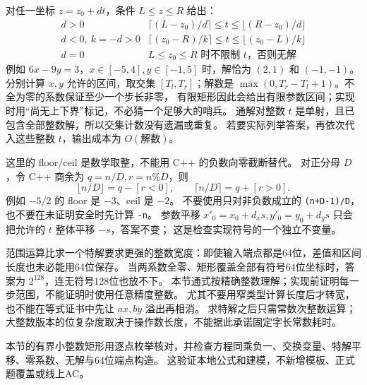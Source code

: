 对任一坐标 $z=z_0+dt$，条件 $L\le z\le R$ 给出：
\[
\begin{array}{c|c}
 d>0 & \lceil(L-z_0)/d\rceil\le t\le\lfloor(R-z_0)/d\rfloor\\[2pt]
 d<0,\ k=-d>0 & \lceil(z_0-R)/k\rceil\le t\le\lfloor(z_0-L)/k\rfloor\\[2pt]
 d=0 & L\le z_0\le R\text{ 时不限制 }t\text{，否则无解}
\end{array}
\]
例如 $6x-9y=3$，$x\in[-5,4],y\in[-1,5]$ 时，解恰为 $(2,1)$ 和 $(-1,-1)$。
分别计算 $x,y$ 允许的区间，取交集 $[T_l,T_r]$；解数是
$\max(0,T_r-T_l+1)$。不全为零的系数保证至少一个步长非零，
有限矩形因此会给出有限参数区间；实现时用“尚无上下界”标记，不必猜一个足够大的哨兵。
通解对整数 $t$ 是单射，且已包含全部整数解，所以交集计数没有遗漏或重复。
若要实际列举答案，再依次代入这些整数 $t$，输出成本为 $O(\text{解数})$。

这里的 floor/ceil 是数学取整，不能用 C++ 的负数向零截断替代。
对正分母 $D$，令 C++ 商余为 $q=n/D,r=n\%D$，则
\[
\lfloor n/D\rfloor=q-[r<0],\qquad
\lceil n/D\rceil=q+[r>0].
\]
例如 $-5/2$ 的 floor 是 $-3$、ceil 是 $-2$。
不要使用只对非负数成立的 \texttt{(n+D-1)/D}，也不要在未证明安全时先计算 \texttt{-n}。
参数平移 $x'_0=x_0+d_xs,y'_0=y_0+d_ys$ 只会把允许的 $t$ 整体平移 $-s$，答案不变；
这是检查实现符号的一个独立不变量。

范围运算比求一个特解要求更强的整数宽度：即使输入端点都是64位，差值和区间长度也未必能用64位保存。
当两系数全零、矩形覆盖全部有符号64位坐标时，答案为 $2^{128}$，连无符号128位也放不下。
本节通式按精确整数理解；实现前证明每一步范围，不能证明时使用任意精度整数。
尤其不要用窄类型计算长度后才转宽，也不能在等式证书中先让 $ax,by$ 溢出再相消。
求特解之后只需常数次整数运算；大整数版本的位复杂度取决于操作数长度，不能据此承诺固定字长常数耗时。

本节的有界小整数矩形用逐点枚举核对，并检查方程同乘负一、交换变量、特解平移、零系数、无解与64位端点构造。
这验证本地公式和建模，不新增模板、正式题覆盖或线上AC。
